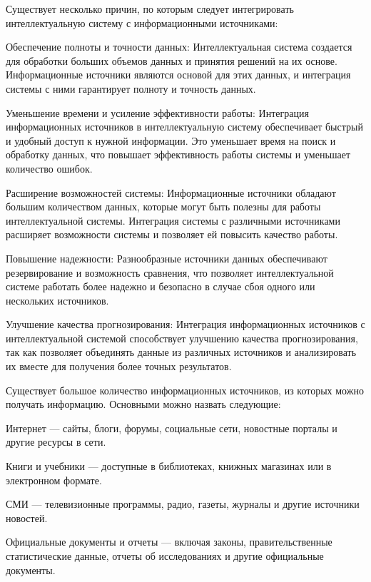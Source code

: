 Существует несколько причин, по которым следует интегрировать интеллектуальную систему с информационными источниками:
\begin{textitemize}
    \item Обеспечение полноты и точности данных: Интеллектуальная система создается для обработки больших объемов данных и принятия решений на их основе. Информационные источники являются основой для этих данных, и интеграция системы с ними гарантирует полноту и точность данных.
    \item Уменьшение времени и усиление эффективности работы: Интеграция информационных источников в интеллектуальную систему обеспечивает быстрый и удобный доступ к нужной информации. Это уменьшает время на поиск и обработку данных, что повышает эффективность работы системы и уменьшает количество ошибок.
    \item Расширение возможностей системы: Информационные источники обладают большим количеством данных, которые могут быть полезны для работы интеллектуальной системы. Интеграция системы с различными источниками расширяет возможности системы и позволяет ей повысить качество работы.
    \item Повышение надежности: Разнообразные источники данных обеспечивают резервирование и возможность сравнения, что позволяет интеллектуальной системе работать более надежно и безопасно в случае сбоя одного или нескольких источников.
    \item Улучшение качества прогнозирования: Интеграция информационных источников с интеллектуальной системой способствует улучшению качества прогнозирования, так как позволяет объединять данные из различных источников и анализировать их вместе для получения более точных результатов.
\end{textitemize}

Существует большое количество информационных источников, из которых можно получать информацию. Основными можно назвать следующие:
\begin{textitemize}
    \item Интернет --- сайты, блоги, форумы, социальные сети, новостные порталы и другие ресурсы в сети.
    \item Книги и учебники --- доступные в библиотеках, книжных магазинах или в электронном формате.
    \item СМИ --- телевизионные программы, радио, газеты, журналы и другие источники новостей.
    \item Официальные документы и отчеты --- включая законы, правительственные статистические данные, отчеты об исследованиях и другие официальные документы.
\end{textitemize}

